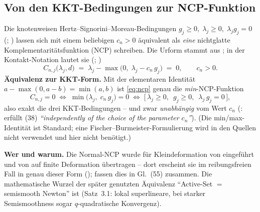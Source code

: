 \documentclass[a4paper,11pt]{article}
\def\bm#1{#1}%
\def\tilde#1{#1}%
\begin{document}
\subsection{Von den KKT-Bedingungen zur NCP-Funktion}
Die knotenweisen Hertz--Signorini--Moreau-Bedingungen
$\tilde g_{j}\ge0,\; \lambda_j\ge0,\; \lambda_j\tilde g_{j}=0$
(\citealp[Gl.~(3.41)]{farah}; \citealp[Gl.~(38)]{gitterle}) lassen sich mit einem beliebigen
$c_n>0$ äquivalent als \emph{eine} nichtglatte Komplementaritätsfunktion (NCP) schreiben. Die Urform
stammt aus \citet[Gl.~(3.9)]{hueber2005}; in der Kontakt-Notation lautet sie
(\citealp[Gl.~(55)]{gitterle}; \citealp[Gl.~(3.58)]{farah})
\begin{equation}
C_{n,j}\big(\lambda_j,\bm d\big) \;=\; \lambda_j - \max\!\big(0,\; \lambda_j - c_n\,\tilde g_{j}\big) \;=\; 0,
\qquad c_n>0 .
\label{eq:ncp}
\end{equation}
\textbf{Äquivalenz zur KKT-Form.} Mit der elementaren Identität
$a - \max(0, a-b) = \min(a,b)$ ist \eqref{eq:ncp} genau die \emph{min}-NCP-Funktion
\begin{equation}
C_{n,j}=0 \;\Longleftrightarrow\; \min\!\big(\lambda_j,\; c_n\,\tilde g_{j}\big)=0
\;\Longleftrightarrow\; \big[\,\lambda_j\ge0,\;\ \tilde g_{j}\ge0,\;\ \lambda_j\,\tilde g_{j}=0\,\big],
\end{equation}
also exakt die drei KKT-Bedingungen -- und zwar \emph{unabhängig} vom Wert $c_n$
(\citealp[Gl.~(56)]{gitterle}: erfüllt (38) \emph{``independently of the choice of the parameter $c_n$''}). (Die
min/max-Identität ist Standard; eine Fischer--Burmeister-Formulierung wird in den Quellen nicht
verwendet und hier nicht benötigt.)

\medskip
\noindent\textbf{Wer und warum.} Die Normal-NCP wurde für Kleindeformation von
\citet{hueber2005} eingeführt und von \citet{poppgeewall2009} auf
finite Deformation übertragen -- dort erscheint sie im reibungsfreien Fall in genau dieser Form
(\citealp[Gl.~(56)]{poppgeewall2009}); \citet{gitterle} fassen dies in Gl.~(55) zusammen. Die
mathematische Wurzel der später genutzten Äquivalenz ``Active-Set $=$ semismooth Newton'' ist
\citet{hik2002} (Satz~3.1: lokal superlineare, bei starker
Semismoothness sogar $q$-quadratische Konvergenz).
\end{document}
